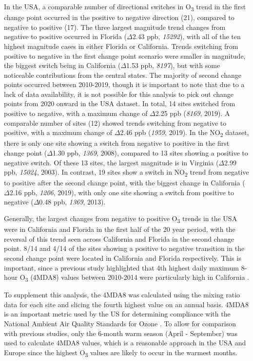 \documentclass[journal abbreviation, manuscript]{copernicus}
\begin{document}
In the USA, a comparable number of directional switches in O\textsubscript{3} trend in the first change point occurred in the positive to negative direction (21), compared to negative to positive (17). The three largest magnitude trend changes from negative to positive occurred in Florida ($\Delta$2.43 ppb, \textit{15292}), with all of the ten highest magnitude cases in either Florida or California. Trends switching from positive to negative in the first change point scenario were smaller in magnitude, the biggest switch being in California ($\Delta$1.53 ppb, \textit{8197}), but with some noticeable contributions from the central states. The majority of second change points occurred between 2010-2019, though it is important to note that due to a lack of data availability, it is not possible for this analysis to pick out change points from 2020 onward in the USA dataset. In total, 14 sites switched from positive to negative, with a maximum change of $\Delta$2.25 ppb (\textit{8169}, 2019). A comparable number of sites (12) showed trends switching from negative to positive, with a maximum change of $\Delta$2.46 ppb (\textit{1959}, 2019). In the NO\textsubscript{2} dataset, there is only one site showing a switch from negative to positive in the first change point ($\Delta$1.30 ppb, \textit{1369}, 2008), compared to 13 sites showing a positive to negative switch. Of these 13 sites, the largest magnitude is in Virginia ($\Delta$2.99  ppb, \textit{15024}, 2003). In contrast, 19 sites show a switch in NO\textsubscript{2} trend from negative to positive after the second change point, with the biggest change in California ($\Delta$2.16 ppb, \textit{1206}, 2019), with only one site showing a switch from positive to negative ($\Delta$0.48 ppb, \textit{1369}, 2013).

Generally, the largest changes from negative to positive O\textsubscript{3} trends in the USA were in California and Florida in the first half of the 20 year period, with the reversal of this trend seen across California and Florida in the second change point. 8/14 and 4/14 of the sites showing a positive to negative transition in the second change point were located in California and Florida respectively. This is important, since a previous study highlighted that 4th highest daily maximum 8-hour O\textsubscript{3} (4MDA8) values between 2010-2014 were particularly high in California \citep{fleming_2018}. 

To supplement this analysis, the 4MDA8 was calculated using the mixing ratio data for each site and slicing the fourth highest value on an annual basis. 4MDA8 is an important metric used by the US for determining compliance with the National Ambient Air Quality Standards for Ozone \citep{EPA_2015, Berrocal_4MDA8}. To allow for comparison with previous studies, only the 6-month warm season (April - September) was used to calculate 4MDA8 values, which is a reasonable approach in the USA and Europe since the highest O\textsubscript{3} values are likely to occur in the warmest months.
\end{document}
